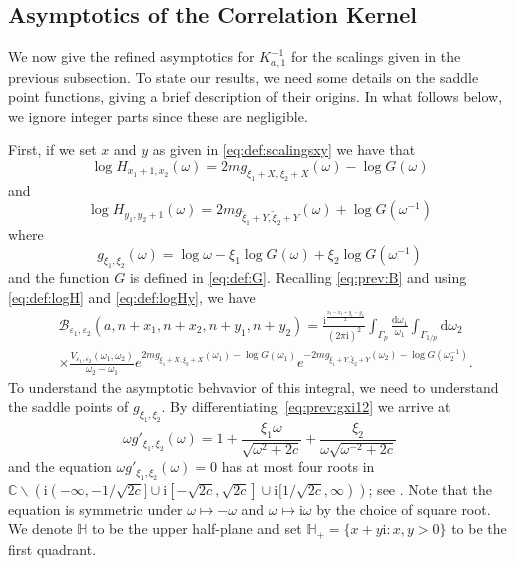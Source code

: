 \documentclass[11pt,twoside]{amsart}
\theoremstyle{plain}
\numberwithin{quest}{section}
\theoremstyle{remark}
\numberwithin{rem}{section}
\theoremstyle{definition}
\newcommand{\eps}{\varepsilon}
\begin{document}
	\subsection{Asymptotics of the Correlation Kernel}\label{subsubsec:Asymptotics}
	
     We now give the refined asymptotics for $K^{-1}_{a,1}$ for the scalings given in the previous subsection.  To state our results, we need some details on the saddle point functions, giving a brief description of their origins.  In what follows below, we ignore integer parts since these are negligible. 
    
    First, if we set $x$ and $y$ as given in \eqref{eq:def:scalingsxy} we have that 
	\begin{equation}\label{eq:def:logH}
		\log H_{x_1+1,x_2}(\omega) =2m g_{\xi_1+X,\xi_2+X}(\omega) -\log G(\omega) 
	\end{equation}
	and 
	\begin{equation}\label{eq:def:logHy}
		\log H_{y_1,y_2+1}(\omega) =2m g_{\tilde{\xi}_1+Y,\tilde{\xi}_2+Y}(\omega) +\log G(\omega^{-1})
	\end{equation}
	where 
	\begin{equation} \label{eq:prev:gxi12}
		g_{\xi_1,\xi_2}(\omega) = \log \omega - \xi_1 \log G(\omega) +\xi_2 \log G(\omega^{-1})
	\end{equation}
	and the function $G$ is defined in \eqref{eq:def:G}. Recalling \eqref{eq:prev:B} and using \eqref{eq:def:logH} and \eqref{eq:def:logHy}, we have
	\begin{equation}
		\begin{split} \label{thmproof:aroundRSsm:B1}
			&\mathcal{B}_{\eps_1,\eps_2}(a,n+x_1,n+x_2,n+y_1,n+y_2)=\frac{\mathrm{i}^{\frac{x_2-x_1+y_1-y_2}{2}}}{(2\pi \mathrm{i})^2} \int_{\Gamma_p} \frac{\mathrm{d}\omega_1}{\omega_1} \int_{\Gamma_{1/p}} \mathrm{d}\omega_2 \\
			&\times \frac{V_{\eps_1,\eps_2}(\omega_1,\omega_2)}{\omega_2 - \omega_1} e^{2m g_{\xi_1+X,\xi_2+X}(\omega_1) -\log G(\omega_1) }e^{-2m g_{\tilde{\xi}_1+Y,\tilde{\xi}_2+Y}(\omega_2) -\log G(\omega_2^{-1})}.
		\end{split}
	\end{equation}
	To understand the asymptotic behvavior of this integral, we need to understand the saddle points of $g_{\xi_1,\xi_2}$. By differentiating~\eqref{eq:prev:gxi12} we arrive at 
	\begin{equation} \label{eq:def:gprime}
		\omega g'_{\xi_1,\xi_2}(\omega)=1+ \frac{\xi_1 \omega}{\sqrt{\omega^2+2c}} +\frac{\xi_2}{\omega \sqrt{\omega^{-2}+2c}}
	\end{equation}
	and the equation $\omega g'_{\xi_1,\xi_2}(\omega)=0$ has at most four roots in $\mathbb{C}\backslash(\mathrm{i}(-\infty,-1/\sqrt{2c}]\cup \mathrm{i} [-\sqrt{2c},\sqrt{2c}] \cup \mathrm{i} [1/\sqrt{2c},\infty))$; see \cite[Lemma 3.7]{CJ16}. 
    Note that the equation is symmetric under $\omega \mapsto -\omega$ and $\omega \mapsto \mathrm{i}\omega$ by the choice of square root.   We denote $\mathbb{H}$ to be the upper half-plane and set $\mathbb{H}_+=\{x+ y \mathrm{i}:x,y>0\}$ to be the first quadrant. 
\end{document}
